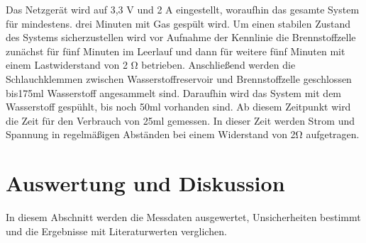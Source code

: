 \documentclass[11pt,a4paper]{article}
\numberwithin{equation}{section}
\begin{document}
\noindent Das Netzger\"at wird auf 3,3 \si{\volt} und 2 A eingestellt, woraufhin das gesamte System f\"ur mindestens. drei Minuten mit Gas gesp\"ult wird. Um einen stabilen Zustand des Systems sicherzustellen wird vor Aufnahme der Kennlinie die Brennstoffzelle zun\"achst f\"ur f\"unf Minuten im Leerlauf und dann f\"ur weitere f\"unf Minuten mit einem Lastwiderstand von 2 \si{\ohm} betrieben.
\newline Anschlie{\ss}end werden die Schlauchklemmen zwischen Wasserstoffreservoir und Brennstoffzelle geschlossen bis175ml Wasserstoff angesammelt sind. Daraufhin wird das System mit dem Wasserstoff gesp\"uhlt, bis noch 50ml vorhanden sind. Ab diesem Zeitpunkt wird die Zeit f\"ur den Verbrauch von 25ml  gemessen. In dieser Zeit werden Strom und Spannung in regelm\"a{\ss}igen Abst\"anden bei einem Widerstand von 2\si{\ohm} aufgetragen.
\newpage
\section{Auswertung und Diskussion}

In diesem Abschnitt werden die Messdaten ausgewertet, Unsicherheiten bestimmt und die Ergebnisse mit Literaturwerten verglichen.
\end{document}
